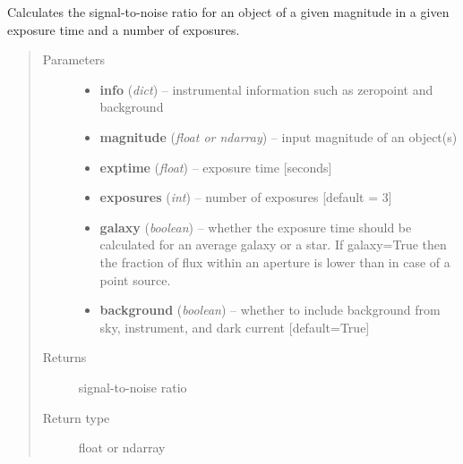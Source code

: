 \documentclass[a4paper,12pt,english]{sphinxmanual}
\begin{document}
\begin{fulllineitems}
\label{ETC:analysis.ETC.SNR}
Calculates the signal-to-noise ratio for an object of a given magnitude in a given exposure time and a
number of exposures.
\begin{quote}\begin{description}
\item[{Parameters}] \leavevmode\begin{itemize}
\item {} 
\textbf{info} (\emph{dict}) -- instrumental information such as zeropoint and background

\item {} 
\textbf{magnitude} (\emph{float or ndarray}) -- input magnitude of an object(s)

\item {} 
\textbf{exptime} (\emph{float}) -- exposure time {[}seconds{]}

\item {} 
\textbf{exposures} (\emph{int}) -- number of exposures {[}default = 3{]}

\item {} 
\textbf{galaxy} (\emph{boolean}) -- whether the exposure time should be calculated for an average galaxy or a star.
If galaxy=True then the fraction of flux within an aperture is lower than in case of a point source.

\item {} 
\textbf{background} (\emph{boolean}) -- whether to include background from sky, instrument, and dark current {[}default=True{]}

\end{itemize}

\item[{Returns}] \leavevmode
signal-to-noise ratio

\item[{Return type}] \leavevmode
float or ndarray

\end{description}\end{quote}

\end{fulllineitems}

\end{document}
